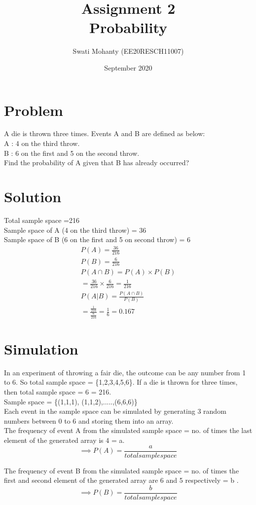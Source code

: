 \documentclass[journal,12pt,twocolumn]{IEEEtran}
\title{Assignment 2
\\Probability }
\author{Swati Mohanty (EE20RESCH11007) }
\date{September 2020}
\begin{document}
\maketitle


\section{Problem}
A die is thrown three times. Events A and B are defined as below:
\\A : 4 on the third throw.
\\B : 6 on the first and 5 on the second throw.
\\Find the probability of A given that B has
already occurred?
\section{Solution}
Total sample space =216
\\Sample space of A (4 on the third throw) = 36
\\Sample space of B (6 on the first and 5 on  second throw) = 6
\begin{align}
    P(A) = \frac{36}{216}
    \\
    P(B) = \frac{6}{216}
    \\
P(A\cap B) = P(A) \times P(B)  
\\= \frac{36}{216} \times \frac{6}{216} = \frac{1}{216}
\\
    P(A | B) = \frac{P(A\cap B)}{P(B)}
    \\
    =\frac{\frac{1}{216}}{\frac{6}{216}} = \frac{1}{6} = 0.167
\end{align}
\section{Simulation}
In an experiment of throwing a fair die, the outcome can be any number from 1 to 6. So total sample space = \{1,2,3,4,5,6\}. If a die is thrown for three times, then total sample space = 6   = 216.
\\
Sample space = \{(1,1,1), (1,1,2),.....,(6,6,6)\(\)\}
\\
Each event in the sample space can be simulated by generating 3 random numbers between 0 to 6 and storing them into an array. \\
The frequency of event A from the simulated sample space = no. of times the last element of the generated array is 4 = a.
\[\implies P(A)= \frac{a}{total sample space}\]

The frequency of event B from the simulated sample space = no. of times the first and second element of the generated array are 6 and 5 respectively = b .
\[\implies P(B)= \frac{b}{total sample space}\]
\end{document}

